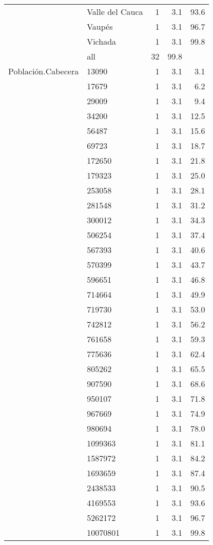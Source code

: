 \documentclass{article}
\begin{document}
\begin{longtable}{llrrr}
   & Valle del Cauca & 1 & 3.1 & 93.6 \\ 
   & Vaupés & 1 & 3.1 & 96.7 \\ 
   & Vichada & 1 & 3.1 & 99.8 \\ 
   \hline
 & all & 32 & 99.8 &  \\ 
   \hline
\hline
Población.Cabecera & 13090 & 1 & 3.1 & 3.1 \\ 
   & 17679 & 1 & 3.1 & 6.2 \\ 
   & 29009 & 1 & 3.1 & 9.4 \\ 
   & 34200 & 1 & 3.1 & 12.5 \\ 
   & 56487 & 1 & 3.1 & 15.6 \\ 
   & 69723 & 1 & 3.1 & 18.7 \\ 
   & 172650 & 1 & 3.1 & 21.8 \\ 
   & 179323 & 1 & 3.1 & 25.0 \\ 
   & 253058 & 1 & 3.1 & 28.1 \\ 
   & 281548 & 1 & 3.1 & 31.2 \\ 
   & 300012 & 1 & 3.1 & 34.3 \\ 
   & 506254 & 1 & 3.1 & 37.4 \\ 
   & 567393 & 1 & 3.1 & 40.6 \\ 
   & 570399 & 1 & 3.1 & 43.7 \\ 
   & 596651 & 1 & 3.1 & 46.8 \\ 
   & 714664 & 1 & 3.1 & 49.9 \\ 
   & 719730 & 1 & 3.1 & 53.0 \\ 
   & 742812 & 1 & 3.1 & 56.2 \\ 
   & 761658 & 1 & 3.1 & 59.3 \\ 
   & 775636 & 1 & 3.1 & 62.4 \\ 
   & 805262 & 1 & 3.1 & 65.5 \\ 
   & 907590 & 1 & 3.1 & 68.6 \\ 
   & 950107 & 1 & 3.1 & 71.8 \\ 
   & 967669 & 1 & 3.1 & 74.9 \\ 
   & 980694 & 1 & 3.1 & 78.0 \\ 
   & 1099363 & 1 & 3.1 & 81.1 \\ 
   & 1587972 & 1 & 3.1 & 84.2 \\ 
   & 1693659 & 1 & 3.1 & 87.4 \\ 
   & 2438533 & 1 & 3.1 & 90.5 \\ 
   & 4169553 & 1 & 3.1 & 93.6 \\ 
   & 5262172 & 1 & 3.1 & 96.7 \\ 
   & 10070801 & 1 & 3.1 & 99.8 \\ 

\end{longtable}
\end{document}
